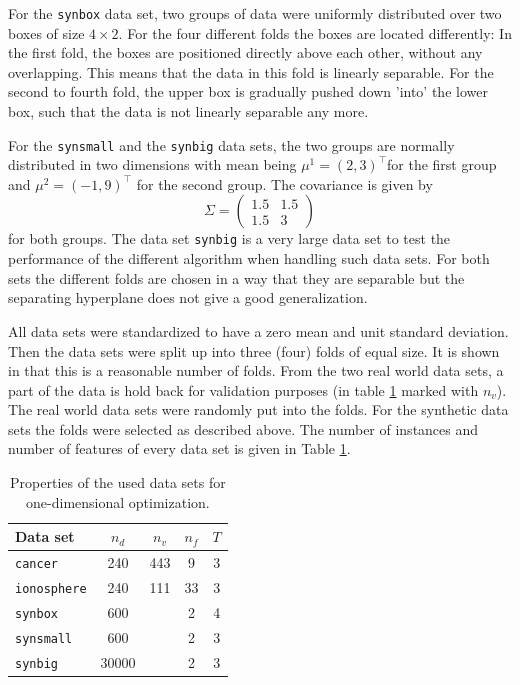 For the \texttt{synbox} data set, two groups of data were uniformly distributed over two boxes of size \(4\times2\). For the four different folds the boxes are located differently: In the first fold, the boxes are positioned directly above each other, without any overlapping. This means that the data in this fold is linearly separable.
For the second to fourth fold, the upper box  is gradually pushed down 'into' the lower box, such that the data is not linearly separable any more.

For the \texttt{synsmall} and the \texttt{synbig} data sets,  the two groups are normally distributed in two dimensions with mean being \(\mu^1 = (2,3)^{\top}\)for the first group and \(\mu^2 = (-1,9)^{\top}\) for the second group. The covariance is given by
 \[\Sigma = \begin{pmatrix}1.5 & 1.5\\1.5 & 3\end{pmatrix}\] for both groups. 
The data set \texttt{synbig} is a very large data set to test the performance of the different algorithm when handling such data sets.
For both sets the different folds are chosen in a way that they are separable but the separating hyperplane does not give a good generalization.

All data sets were standardized to have a zero mean and unit standard deviation. Then the data sets were split up into three (four) folds of equal size. It is shown in \cite[p. 47]{Kunapuli2008} that this is a reasonable number of folds.
From the two real world data sets, a part of the data is hold back for validation purposes (in table \ref{tab_set_props} marked with \(n_v\)).
The real world data sets were randomly put into the folds. For the synthetic data sets the folds were selected as described above. The number of instances and number of features of every data set is given in Table \ref{tab_set_props}. 

\begin{center}
\begin{table}[H]%
	\begin{tabular}{|lcccc|}
		\hline
    Data set & \(n_d\) & \(n_v\) &  \(n_f\) & \(T\) \\
		\hline
		\texttt{cancer} & 240 & 443 & 9 & 3 \\
		\texttt{ionosphere} & 240 & 111 & 33 & 3 \\
		\texttt{synbox} & 600 && 2 & 4 \\
		\texttt{synsmall} & 600 && 2 & 3 \\
		\texttt{synbig} & 30000 && 2 & 3 \\
		\hline
	\end{tabular}
	\caption[Properties of data sets, 1D]{Properties of the used data sets for one-dimensional optimization.}
	\label{tab_set_props}
\end{table}
\end{center}

